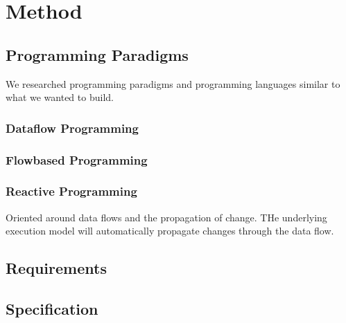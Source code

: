 \chapter{Method}

\section{Programming Paradigms}
We researched programming paradigms and programming languages similar
to what we wanted to build.

\subsection{Dataflow Programming}

\subsection{Flowbased Programming}

\subsection{Reactive Programming}
Oriented around data flows and the propagation of change. THe
underlying execution model will automatically propagate changes
through the data flow.

\section{Requirements}

\section{Specification}

